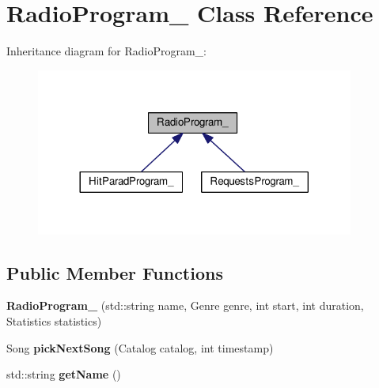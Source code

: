 \hypertarget{class_radio_program__}{}\section{Radio\+Program\+\_\+ Class Reference}
\label{class_radio_program__}


Inheritance diagram for Radio\+Program\+\_\+\+:
\nopagebreak
\begin{figure}[H]
\begin{center}
\leavevmode
\includegraphics[width=296pt]{class_radio_program____inherit__graph}
\end{center}
\end{figure}
\subsection*{Public Member Functions}
\begin{DoxyCompactItemize}
\item 
{\bfseries Radio\+Program\+\_\+} (std\+::string name, Genre genre, int start, int duration, Statistics statistics)\hypertarget{class_radio_program___adddccea7716c357eea50ba8c325dcd9b}{}\label{class_radio_program___adddccea7716c357eea50ba8c325dcd9b}

\item 
Song {\bfseries pick\+Next\+Song} (Catalog catalog, int timestamp)\hypertarget{class_radio_program___a88bb1b26329c4f217a0192e1601ca13b}{}\label{class_radio_program___a88bb1b26329c4f217a0192e1601ca13b}

\item 
std\+::string {\bfseries get\+Name} ()\hypertarget{class_radio_program___abc521ae542ecdcaca987164f19d94d09}{}\label{class_radio_program___abc521ae542ecdcaca987164f19d94d09}

\end{DoxyCompactItemize}
